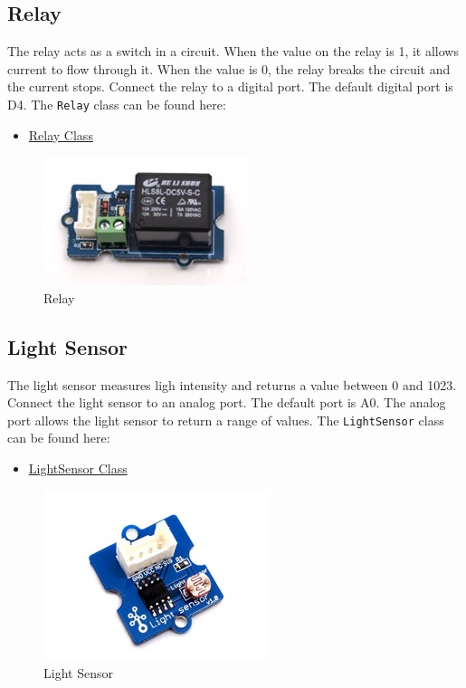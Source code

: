 \subsection{Relay}\label{relay}

The relay acts as a switch in a circuit. When the value on the relay is
1, it allows current to flow through it. When the value is 0, the relay
breaks the circuit and the current stops. Connect the relay to a digital
port. The default digital port is D4. The \texttt{Relay} class can be
found here:

\begin{itemize}
\tightlist
\item
  \href{https://github.com/cloudmesh/cloudmesh.pi/blob/master/cloudmesh/pi/relay.py}{Relay
  Class}
\end{itemize}

\begin{figure}
\centering
\includegraphics{../images/grovepi/relay.jpg}
\caption{Relay}
\end{figure}

\subsection{Light Sensor}\label{light-sensor}

The light sensor measures ligh intensity and returns a value between 0
and 1023. Connect the light sensor to an analog port. The default port
is A0. The analog port allows the light sensor to return a range of
values. The \texttt{LightSensor} class can be found here:

\begin{itemize}
\tightlist
\item
  \href{https://github.com/cloudmesh/cloudmesh.pi/blob/master/cloudmesh/pi/light.py}{LightSensor
  Class}
\end{itemize}

\begin{figure}
\centering
\includegraphics{../images/grovepi/light.jpg}
\caption{Light Sensor}
\end{figure}

